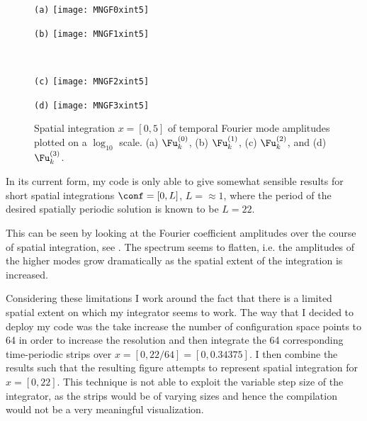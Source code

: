 \begin{figure}[h]
  \begin{minipage}[height=.20\textheight]{.48\textwidth}
    \centering \small{\texttt{(a)}}
    \texttt{[image: MNGF0xint5]}
  \end{minipage}
  \begin{minipage}[height=.20\textheight]{.48\textwidth}
    \centering \small{\texttt{(b)}}
    \texttt{[image: MNGF1xint5]}
  \end{minipage}
  \\
  \begin{minipage}[height=.20\textheight]{.48\textwidth}
    \centering \small{\texttt{(c)}}
    \texttt{[image: MNGF2xint5]}
  \end{minipage}
  \centering
  \begin{minipage}[height=.20\textheight]{.48\textwidth}
    \centering \small{\texttt{(d)}}
    \texttt{[image: MNGF3xint5]}
  \end{minipage}
   \caption{
   Spatial integration $x=[0,5]$ of temporal Fourier mode amplitudes plotted on a
   $\log_{10}$ scale. (a) $\Fu^{(0)}_{k}$, (b) $\Fu^{(1)}_{k}$,
   (c) $\Fu^{(2)}_{k}$, and (d) $\Fu^{(3)}_{k}$.
            }
  \label{fig:MNGrfig1}
\end{figure}

In its current form, my code is only able to give somewhat sensible
results for short spatial integrations $\conf = [0, L]$, $L = \approx 1$,
where the period of the desired spatially periodic solution is known to
be $L=22$.

This can be seen by looking at the Fourier coefficient amplitudes over
the course of spatial integration, see . The spectrum
seems to flatten, i.e. the amplitudes of the higher modes grow
dramatically as the spatial extent of the integration is increased.

Considering these limitations I work around the fact that there is a
limited spatial extent on which my integrator seems to work. The way that
I decided to deploy my code was the take increase the number of
configuration space points to 64 in order to increase the resolution and
then integrate the 64 corresponding time-periodic strips over $x = [0,
22/64] = [0, 0.34375]$. I then combine the results such that the
resulting figure attempts to represent spatial integration for $x =
[0,22]$. This technique is not able to exploit the variable step size of
the integrator, as the strips would be of varying sizes and hence the
compilation would not be a very meaningful visualization.

